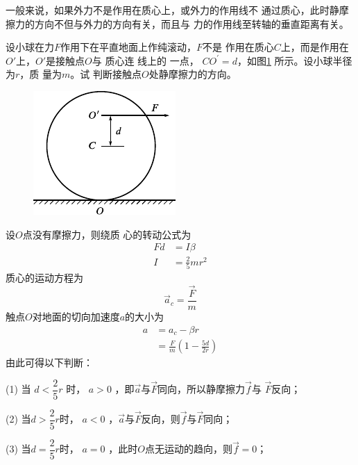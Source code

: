 一般来说，如果外力不是作用在质心上，或外力的作用线不
通过质心，此时静摩擦力的方向不但与外力的方向有关，而且与
力的作用线至转轴的垂直距离有关。

\example 设小球在力$ F $作用下在平直地面上作纯滚动，$ F $不是
作用在质心$ C $上，而是作用在$ O' $上，$ O' $是接触点$ O $与
质心连
\clearpage\noindent
线上的
一点， $ C O ^ { \prime } = d $，如图\ref{fig:10.18} 所示。设小球半径为$ r $，质
量为$ m $。试
判断接触点$ O $处静摩擦力的方向。

\begin{figure}
    \centering
    \includegraphics{figure/fig10.18}
    \caption{}
    \label{fig:10.18}
\end{figure}
\solution 设$ O $点没有摩擦力，则绕质
心的转动公式为
\begin{equation*}
    \begin{split}
        F  d &= I \beta \\
        I &= \frac { 2 } { 5 } m r ^ { 2 }
    \end{split}
\end{equation*}
质心的运动方程为
\begin{equation*}
    \vec{a} _ { c } = \frac { \vec{F} } { m }
\end{equation*}
触点$ O $对地面的切向加速度$ a $的大小为
\begin{equation*}
    \begin{split}
        a &= a _ { c } - \beta r \\
          &= \frac { F } { m } \left( 1 - \frac { 5 d } { 2 r } \right)
    \end{split}
\end{equation*}
由此可得以下判断：

(1) 当 $  d < \dfrac { 2 } { 5 } r $  时， $ a > 0 $  ，即$ \vec{a} $与$ \vec{F} $同向，所以静摩擦力$ \vec{f} $与
$ \vec{F} $反向；

(2) 当$  d > \dfrac { 2 } { 5 } r $时， $ a < 0 $  ，$ \vec{a} $与$ \vec{F} $反向，则$ \vec{f} $与$ \vec{F} $同向；

(3) 当$  d = \dfrac { 2 } { 5 } r $时， $ a = 0 $  ，此时$ O $点无运动的趋向，则$ \vec{f} = 0   $；


